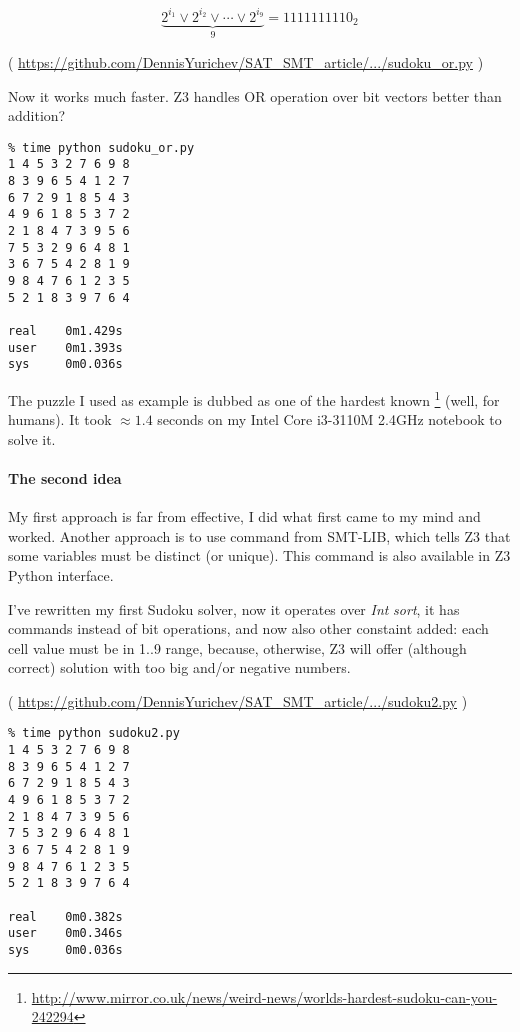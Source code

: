 \begin{equation}
\underbrace{2^{i_1} \vee 2^{i_2} \vee \cdots \vee 2^{i_9}}_9 = 1111111110_2
\end{equation}


( \url{https://github.com/DennisYurichev/SAT_SMT_article/.../sudoku_or.py} )

Now it works much faster. Z3 handles OR operation over bit vectors better than addition?

\begin{lstlisting}
% time python sudoku_or.py
1 4 5 3 2 7 6 9 8
8 3 9 6 5 4 1 2 7
6 7 2 9 1 8 5 4 3
4 9 6 1 8 5 3 7 2
2 1 8 4 7 3 9 5 6
7 5 3 2 9 6 4 8 1
3 6 7 5 4 2 8 1 9
9 8 4 7 6 1 2 3 5
5 2 1 8 3 9 7 6 4

real    0m1.429s
user    0m1.393s
sys     0m0.036s
\end{lstlisting}

The puzzle I used as example is dubbed as one of the hardest known
\footnote{\url{http://www.mirror.co.uk/news/weird-news/worlds-hardest-sudoku-can-you-242294}} (well, for humans).
It took $\approx 1.4$ seconds on my Intel Core i3-3110M 2.4GHz notebook to solve it.

\paragraph{The second idea}

My first approach is far from effective, I did what first came to my mind and worked.
Another approach is to use  command from SMT-LIB, which tells Z3 that some variables must be distinct (or unique).
This command is also available in Z3 Python interface.

I've rewritten my first Sudoku solver, now it operates over \textit{Int} \textit{sort}, it has  commands instead of bit operations,
and now also other constaint added: each cell value must be in 1..9 range, because, otherwise, Z3 will offer (although correct) solution with too big
and/or negative numbers.


( \url{https://github.com/DennisYurichev/SAT_SMT_article/.../sudoku2.py} )

\begin{lstlisting}
% time python sudoku2.py
1 4 5 3 2 7 6 9 8
8 3 9 6 5 4 1 2 7
6 7 2 9 1 8 5 4 3
4 9 6 1 8 5 3 7 2
2 1 8 4 7 3 9 5 6
7 5 3 2 9 6 4 8 1
3 6 7 5 4 2 8 1 9
9 8 4 7 6 1 2 3 5
5 2 1 8 3 9 7 6 4

real    0m0.382s
user    0m0.346s
sys     0m0.036s
\end{lstlisting}

